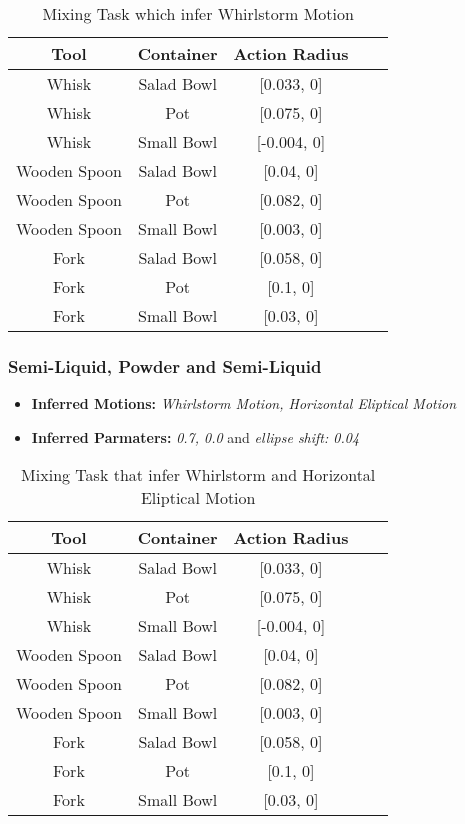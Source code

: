 \begin{table}[H]
    \centering
    \begin{tabular}{|c|c|c|c|c|}
      \hline
      \textbf{Tool} & \textbf{Container} & \textbf{Action Radius}\\
      \hline
      Whisk & Salad Bowl & [0.033, 0] \\
      \hline
      Whisk & Pot & [0.075, 0] \\
      \hline
      Whisk & Small Bowl & [-0.004, 0]\\
      \hline
      Wooden Spoon & Salad Bowl & [0.04, 0] \\
      \hline
      Wooden Spoon & Pot & [0.082, 0] \\
      \hline
      Wooden Spoon & Small Bowl & [0.003, 0] \\
      \hline
      Fork & Salad Bowl & [0.058, 0] \\
      \hline
      Fork & Pot & [0.1, 0] \\
      \hline
      Fork & Small Bowl & [0.03, 0] \\
      \hline
    \end{tabular}
    \caption{Mixing Task which infer Whirlstorm Motion}
    
  \end{table}



\subsubsection{Semi-Liquid, Powder and Semi-Liquid}
\begin{itemize}
    \item \textbf{Inferred Motions:} \textit{Whirlstorm Motion, Horizontal Eliptical Motion}
    \item \textbf{Inferred Parmaters:} \textit{0.7, 0.0} and \textit{ellipse shift: 0.04}
\end{itemize}
  
\begin{table}[H]
    \centering
    \begin{tabular}{|c|c|c|c|c|}
    \hline
    \textbf{Tool} & \textbf{Container} & \textbf{Action Radius}\\
    \hline
    Whisk & Salad Bowl & [0.033, 0] \\
    \hline
    Whisk & Pot & [0.075, 0] \\
    \hline
    Whisk & Small Bowl & [-0.004, 0]\\
    \hline
    Wooden Spoon & Salad Bowl & [0.04, 0] \\
    \hline
    Wooden Spoon & Pot & [0.082, 0] \\
    \hline
    Wooden Spoon & Small Bowl & [0.003, 0] \\
    \hline
    Fork & Salad Bowl & [0.058, 0] \\
    \hline
    Fork & Pot & [0.1, 0] \\
    \hline
    Fork & Small Bowl & [0.03, 0] \\
    \hline
\end{tabular}
\caption{Mixing Task that infer Whirlstorm and Horizontal Eliptical Motion}

\end{table}